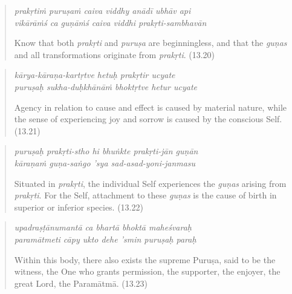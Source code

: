 \documentclass[12pt, twoside, openright]{memoir}
\begin{document}
\par
\begin{verse}
\textit{prakṛtiṁ puruṣaṁ caiva viddhy anādī ubhāv api} \\
\textit{vikārāṁś ca guṇāṁś caiva viddhi prakṛti-sambhavān}

\noindent Know that both \textit{prakṛti} and \textit{puruṣa} are beginningless, and that the \textit{guṇas} and all transformations originate from \textit{prakṛti}. (13.20)
\end{verse}
\par



\par
\begin{verse}
\textit{kārya-kāraṇa-kartṛtve hetuḥ prakṛtir ucyate} \\
\textit{puruṣaḥ sukha-duḥkhānāṁ bhoktṛtve hetur ucyate}

\noindent Agency in relation to cause and effect is caused by material nature, while the sense of experiencing joy and sorrow is caused by the conscious Self. (13.21)
\end{verse}
\par



\par
\begin{verse}
\textit{puruṣaḥ prakṛti-stho hi bhuṅkte prakṛti-jān guṇān} \\
\textit{kāraṇaṁ guṇa-saṅgo ’sya sad-asad-yoni-janmasu}

\noindent Situated in \textit{prakṛti}, the individual Self experiences the \textit{guṇas} arising from \textit{prakṛti}. For the Self, attachment to these \textit{guṇas} is the cause of birth in superior or inferior species. (13.22)
\end{verse}
\par



\par
\begin{verse}
\textit{upadraṣṭānumantā ca bhartā bhoktā maheśvaraḥ} \\
\textit{paramātmeti cāpy ukto dehe ’smin puruṣaḥ paraḥ}

\noindent Within this body, there also exists the supreme Puruṣa, said to be the witness, the One who grants permission, the supporter, the enjoyer, the great Lord, the Paramātmā. (13.23)
\end{verse}
\par
\end{document}
